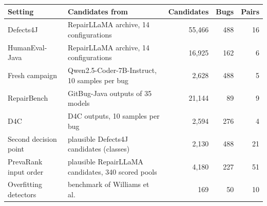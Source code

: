 \begin{tabularx}{\linewidth}{@{}lYrrr@{}}
\toprule
Setting & Candidates from & Candidates & Bugs & Pairs \\
\midrule
Defects4J & RepairLLaMA archive, 14 configurations & 55,466 & 488 & 16 \\
HumanEval-Java & RepairLLaMA archive, 14 configurations & 16,925 & 162 & 6 \\
Fresh campaign & Qwen2.5-Coder-7B-Instruct, 10 samples per bug & 2,628 & 488 & 5 \\
RepairBench & GitBug-Java outputs of 35 models & 21,144 & 89 & 9 \\
D4C & D4C outputs, 10 samples per bug & 2,594 & 276 & 4 \\
Second decision point & plausible Defects4J candidates (classes) & 2,130 & 488 & 21 \\
PrevaRank input order & plausible RepairLLaMA candidates, 340 scored pools & 4,180 & 227 & 51 \\
Overfitting detectors & benchmark of Williams et al.~\cite{williams2026pod} & 169 & 50 & 10 \\
\bottomrule
\end{tabularx}
